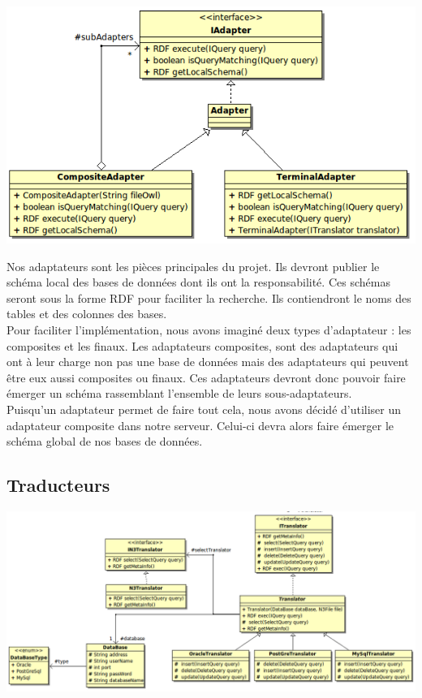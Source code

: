 \documentclass[12pt]{article}
\begin{document}
\begin{center}
	\includegraphics[scale=0.70]{images/Adapter.png}
\end{center}

	Nos adaptateurs sont les pièces principales du projet. Ils devront publier le schéma local des bases de données dont ils ont la responsabilité. Ces schémas seront sous la forme RDF pour faciliter la recherche. Ils contiendront le noms des tables et des colonnes des bases.\\
	\indent Pour faciliter l'implémentation, nous avons imaginé deux types d'adaptateur : les composites et les finaux.
	\indent Les adaptateurs composites, sont des adaptateurs qui ont à leur charge non pas une base de données mais des adaptateurs qui peuvent être eux aussi composites ou finaux. Ces adaptateurs devront donc pouvoir faire émerger un schéma rassemblant l'ensemble de leurs sous-adaptateurs.\\
	\indent Puisqu'un adaptateur permet de faire tout cela, nous avons décidé d'utiliser un adaptateur composite dans notre serveur. Celui-ci devra alors faire émerger le schéma global de nos bases de données.

\subsection{Traducteurs}

\begin{center}
	\includegraphics[scale=0.50]{images/Translator.png}
\end{center}
\end{document}

